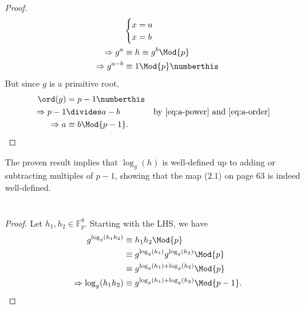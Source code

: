 \documentclass[
  coursecode={MTHE 418},
  assignmentname={Homework \homeworknumber},
  studentnumber=20053722,
  name={Bryan Hoang},
  draft,
  final,
]{
  ltxanswer%
}
\begin{document}
  \begin{questions}
    \setcounter{question}{\questionnumber}
    \addtocounter{question}{-1}
    \question[10]\
    \begin{parts}
      \part{}
      \begin{solution}
        \begin{proof}
          \begin{align*}
                                &\begin{cases}
                                   x=a \\
                                   x=b
                                 \end{cases}                                  \\
            \Rightarrow g^{a}   &\equiv h \equiv g^{b} \Mod{p}                 \\
            \Rightarrow g^{a-b} &\equiv 1 \Mod{p}\numberthis\label{eq:a-power}
          \end{align*}
          But since \(g\) is a primitive root,
          \begin{align*}
            \ord(g)         &= p-1\numberthis\label{eq:a-order}                                                        \\
            \Rightarrow p-1 &\divides a-b                       & &\text{by~\eqref{eq:a-power} and~\eqref{eq:a-order}} \\
            \Rightarrow a   &\equiv b \Mod{p-1}.
          \end{align*}
        \end{proof}
        The proven result implies that \(\log_{g}(h)\) is well-defined up to adding or subtracting multiples of \(p-1\), showing that the map (2.1) on page 63 is indeed well-defined.
      \end{solution}

      \part{}
      \begin{solution}
        \begin{proof}
          Let \(h_{1}, h_{2} \in \mathbb{F}_{p}^{8}\). Starting with the LHS, we have
          \begin{align*}
            g^{\log_{g}(h_{1}h_{2})}         &\equiv h_{1} h_{2} \Mod{p}                               \\
                                             &\equiv g^{\log_{g}(h_{1})} g^{\log_{g}(h_{2})} \Mod{p}   \\
                                             &\equiv g^{\log_{g}(h_{1})+\log_{g}(h_{2})} \Mod{p}       \\
            \Rightarrow \log_{g}(h_{1}h_{2}) &\equiv g^{\log_{g}(h_{1}) + \log_{g}(h_{2})}  \Mod{p-1}.
          \end{align*}
        \end{proof}
      \end{solution}


\end{parts}
\end{questions}
\end{document}
